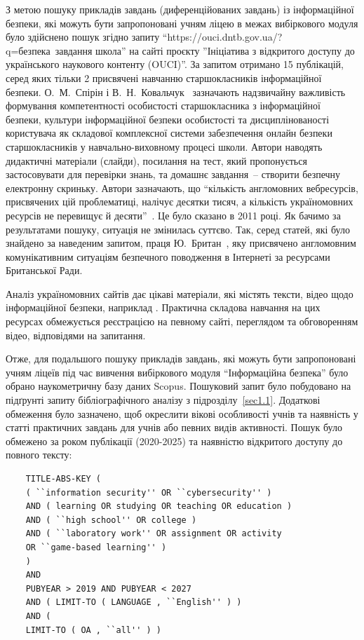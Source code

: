 З метою пошуку прикладів завдань (диференційованих завдань) із інформаційної безпеки, які можуть бути запропоновані учням ліцею в межах вибіркового модуля було здійснено пошук згідно запиту ``https://ouci.dntb.gov.ua/?q= безпека\textquotedbl~завдання школа'' на сайті проєкту ''Ініціатива з відкритого доступу до українського наукового контенту (OUCI)''. За запитом отримано 15 публікацій, серед яких тільки 2 присвячені навчанню старшокласників інформаційної безпеки. О.~М.~Спірін і В.~Н.~Ковальчук~\cite{Spirin_Kovalchuk_2011} зазначають надзвичайну важливість формування компетентності особистості старшокласника з інформаційної безпеки, культури інформаційної безпеки особистості та дисциплінованості користувача як складової комплексної системи забезпечення онлайн безпеки старшокласників у навчально-виховному процесі школи. Автори наводять дидактичні матеріали (слайди), посилання на тест, який пропонується застосовувати для перевірки знань, та домашнє завдання~-- створити безпечну електронну скриньку. Автори зазначають, що ``кількість англомовних вебресурсів, присвячених цій проблематиці, налічує десятки тисяч, а кількість україномовних ресурсів не перевищує й десяти''~\cite{Spirin_Kovalchuk_2011}. Це було сказано в 2011 році. Як бачимо за результатами пошуку, ситуація не змінилась суттєво. Так, серед статей, які було знайдено за наведеним запитом, праця Ю.~Британ~\cite{Британ2023}, яку присвячено англомовним комунікативним ситуаціям безпечного поводження в Інтернеті за ресурсами Британської Ради. 

Аналіз україномовних сайтів дає цікаві матеріали, які містять тексти, відео щодо інформаційної безпеки, наприклад \cite{Віртуальний_кабінет_інформатики}. Практична складова навчання на цих ресурсах обмежується реєстрацією на певному сайті, переглядом та обговоренням відео, відповідями на запитання.

Отже, для подальшого пошуку прикладів завдань, які можуть бути запропоновані учням ліцеїв під час вивчення вибіркового модуля ``Інформаційна безпека'' було обрано наукометричну базу даних Scopus. Пошуковий запит було побудовано на підґрунті запиту бібліографічного аналізу з підрозділу~\ref{sec1.1}. Додаткові обмеження було зазначено, щоб окреслити вікові особливості учнів та наявність у статті практичних завдань для учнів або певних видів активності. Пошук було обмежено за роком публікації (2020-2025) та наявністю відкритого доступу до повного тексту:
\begin{verbatim}
    TITLE-ABS-KEY ( 
    ( ``information security'' OR ``cybersecurity'' ) 
    AND ( learning OR studying OR teaching OR education ) 
    AND ( ``high school'' OR college ) 
    AND ( ``laboratory work'' OR assignment OR activity 
    OR ``game-based learning'' ) 
    ) 
    AND 
    PUBYEAR > 2019 AND PUBYEAR < 2027 
    AND ( LIMIT-TO ( LANGUAGE , ``English'' ) ) 
    AND (
    LIMIT-TO ( OA , ``all'' ) )
\end{verbatim}

